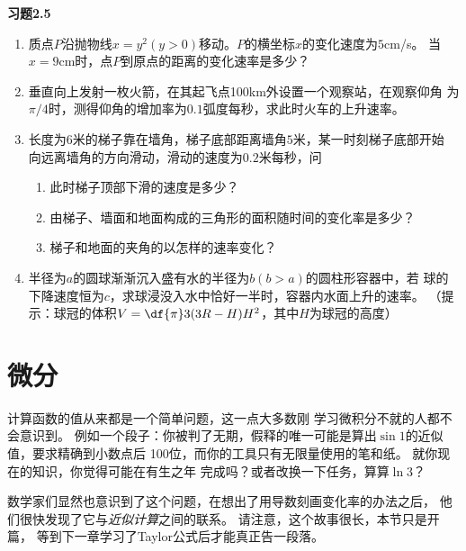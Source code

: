 \begin{ext}
	{\centering\bf 习题2.5}
	
	\begin{enumerate}  
	  \item 质点$P$沿抛物线$x=y^2(y>0)$移动。$P$的横坐标$x$的变化速度为$5$cm/s。
		当$x=9$cm时，点$P$到原点的距离的变化速率是多少？
	  \item 垂直向上发射一枚火箭，在其起飞点100km外设置一个观察站，在观察仰角
	  为$\pi/4$时，测得仰角的增加率为$0.1$弧度每秒，求此时火车的上升速率。
	  \item 长度为$6$米的梯子靠在墙角，梯子底部距离墙角$5$米，某一时刻梯子底部开始
	  向远离墙角的方向滑动，滑动的速度为$0.2$米每秒，问
	  \begin{enumerate}[(1)]
	    \item 此时梯子顶部下滑的速度是多少？
	    \item 由梯子、墙面和地面构成的三角形的面积随时间的变化率是多少？
	    \item 梯子和地面的夹角的以怎样的速率变化？
	  \end{enumerate}
	  \item 半径为$a$的圆球渐渐沉入盛有水的半径为$b(b>a)$的圆柱形容器中，若
	  球的下降速度恒为$c$，求球浸没入水中恰好一半时，容器内水面上升的速率。
	  （提示：球冠的体积$V=\df{\pi}3(3R-H)H^2$，其中$H$为球冠的高度）
	\end{enumerate}
\end{ext}

\section{微分}

计算函数的值从来都是一个简单问题，这一点大多数刚
学习微积分不就的人都不会意识到。
例如一个段子：你被判了无期，假释的唯一可能是算出$\sin 1$的近似值，要求精确到小数点后
100位，而你的工具只有无限量使用的笔和纸。
就你现在的知识，你觉得可能在有生之年
完成吗？或者改换一下任务，算算$\ln 3$？

数学家们显然也意识到了这个问题，在想出了用导数刻画变化率的办法之后，
他们很快发现了它与{\it 近似计算}之间的联系。
请注意，这个故事很长，本节只是开篇，
等到下一章学习了Taylor公式后才能真正告一段落。

